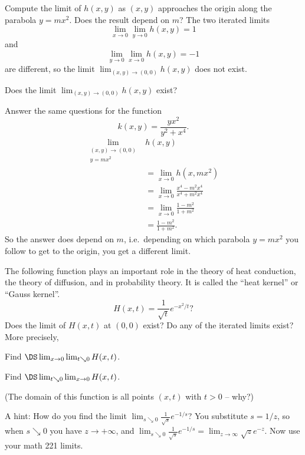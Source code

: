 \begin{multicols}{2}
\subprob Compute the limit of $h(x, y)$ as $(x,y)$ approaches the
origin along the parabola $y=mx^2$.  Does the result depend on $m$?
\answer%
The two iterated limits
\[
\lim_{x\to0}\lim_{y\to0} h(x, y) = 1
\]
and
\[
\lim_{y\to0}\lim_{x\to0} h(x, y) = -1
\]
are different, so the limit $\lim_{(x,y)\to(0,0)}h(x, y)$ does not exist.
\endanswer


\subprob Does the limit $\lim_{(x,y)\to(0,0)}h(x, y)$ exist?

\subprob Answer the same questions for the function
\[
k(x, y) = \frac{yx^2}{y^2+x^4}.
\]
\answer%
\begin{align*}
  \lim_{\substack{(x, y)\to(0,0)\\y=mx^2}}& h(x,y)\\
  &=\lim_{x\to 0} h(x, mx^2)\\
  &=\lim_{x\to0} \frac{x^4 - m^2x^4} {x^4+m^2x^4}\\
  &=\lim_{x\to0} \frac{1 - m^2} {1+m^2}\\
  &=\frac{1 - m^2} {1+m^2}.
\end{align*}
So the answer does depend on $m$, i.e.\ depending
on which parabola $y=mx^2$ you follow to get to the origin,
you get a different limit.
\endanswer


\problem The following function plays an important role in the theory%
of heat conduction, the theory of diffusion, and in probability
theory.  It is called the ``heat kernel'' or ``Gauss kernel''.
\[
H(x, t) = \frac{1}{\sqrt{t}} e^{-{x^2}/{t}}?
\]
Does the limit of $H(x, t)$ at $(0,0)$ exist?  Do any of the iterated
limits exist? More precisely,

\subprob Find $\DS \lim_{x\to 0}\lim_{t\searrow 0} H(x, t)$.

\subprob Find $\DS \lim_{t\searrow 0}\lim_{x\to 0} H(x, t)$.

(The domain of this function is all points $(x,t)$ with $t>0$ -- why?)

A hint:  How do you find the limit $\lim_{s\searrow
0}\frac{1}{\surd s}e^{-1/s}$?  You substitute $s=1/z$, so when $s\searrow 0$
you have $z\to+\infty$, and $\lim_{s\searrow 0}\frac1{\surd s} e^{-1/s} =
\lim_{z\to\infty} \sqrt z e^{-z}$.  Now use your math 221 limits.

\end{multicols}


